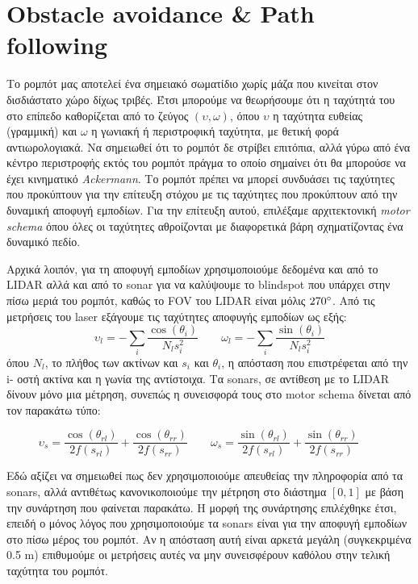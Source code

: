 \section*{Obstacle avoidance \& Path following}
Το ρομπότ μας αποτελεί ένα σημειακό σωματίδιο χωρίς μάζα που κινείται στον δισδιάστατο χώρο δίχως 
τριβές. Έτσι μπορούμε να θεωρήσουμε ότι η ταχύτητά του στο επίπεδο καθορίζεται από το ζεύγος
$\left( \upsilon, \omega \right)$, όπου $\upsilon$ η ταχύτητα ευθείας (γραμμική) και $\omega$ η 
γωνιακή ή περιστροφική ταχύτητα, με θετική φορά αντιωρολογιακά. Να σημειωθεί ότι το ρομπότ δε 
στρίβει επιτόπια, αλλά γύρω από ένα κέντρο περιστροφής εκτός του ρομπότ πράγμα το οποίο σημαίνει
ότι θα μπορούσε να έχει κινηματικό \emph{Ackermann}. Το ρομπότ πρέπει να μπορεί συνδυάσει τις 
ταχύτητες που προκύπτουν για την επίτευξη στόχου με τις ταχύτητες που προκύπτουν από την δυναμική 
αποφυγή εμποδίων. Για την επίτευξη αυτού, επιλέξαμε αρχιτεκτονική \emph{motor schema} όπου όλες οι 
ταχύτητες αθροίζονται με διαφορετικά βάρη σχηματίζοντας ένα δυναμικό πεδίο.

Αρχικά λοιπόν, για τη αποφυγή εμποδίων χρησιμοποιούμε δεδομένα και από το LIDAR αλλά και από το 
sonar για να καλύψουμε το blindspot που υπάρχει στην πίσω μεριά του ρομπότ, καθώς το FOV του LIDAR 
είναι μόλις $270\degree$. Από τις μετρήσεις του laser εξάγουμε τις ταχύτητες αποφυγής εμποδίων ως 
εξής:
$$
\upsilon_{l} = - \sum_i \frac{\cos(\theta_i)}{N_l s_i^2} \qquad 
\omega_{l} = - \sum_i \frac{\sin(\theta_i)}{N_l s_i^2}
$$
όπου $N_l$, το πλήθος των ακτίνων και $s_i$ και $\theta_i$, η απόσταση που επιστρέφεται από την i-
οστή ακτίνα και η γωνία της αντίστοιχα. Τα sonars, σε αντίθεση με το LIDAR δίνουν μόνο μια μέτρηση, συνεπώς η συνεισφορά τους στο motor schema δίνεται από τον παρακάτω τύπο:

$$
\upsilon_{s} = \frac{\cos(\theta_{rl})}{2 f(s_{rl})} + \frac{\cos(\theta_{rr})}{2 f(s_{rr})}\qquad 
\omega_{s} = \frac{\sin(\theta_{rl})}{2 f(s_{rl})} + \frac{\sin(\theta_{rr})}{2 f(s_{rr})}\qquad 
$$

Εδώ αξίζει να σημειωθεί πως δεν χρησιμοποιούμε απευθείας την πληροφορία από τα sonars, αλλά αντιθέτως κανονικοποιούμε την μέτρηση στο διάστημα $[0,1]$ με βάση την συνάρτηση που φαίνεται παρακάτω. Η μορφή της συνάρτησης επιλέχθηκε έτσι, επειδή ο μόνος λόγος που χρησιμοποιούμε τα sonars είναι για την αποφυγή εμποδίων στο πίσω μέρος του ρομπότ. Αν η απόσταση αυτή είναι αρκετά μεγάλη (συγκεκριμένα 0.5 m) επιθυμούμε οι μετρήσεις αυτές να μην συνεισφέρουν καθόλου στην τελική ταχύτητα του ρομπότ.

